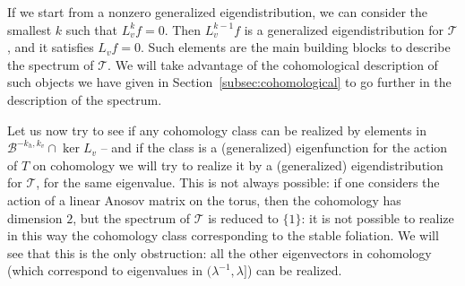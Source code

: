 \documentclass[10pt]{amsart}
\newcommand{\boB}{\mathcal{B}}
\newcommand{\boT}{\mathcal{T}}
\theoremstyle{definition}
\numberwithin{equation}{section}
\begin{document}
If we start from a nonzero generalized eigendistribution, we can consider the
smallest $k$ such that $L_v^k f = 0$. Then $L_v^{k-1} f$ is a generalized
eigendistribution for $\boT$, and it satisfies $L_v f = 0$. Such elements are
the main building blocks to describe the spectrum of $\boT$. We will take
advantage of the cohomological description of such objects we have given in
Section~\ref{subsec:cohomological} to go further in the description of the
spectrum.

Let us now try to see if any cohomology class can be realized by elements in
$\boB^{-k_h, k_v} \cap \ker L_v$ -- and if the class is a (generalized)
eigenfunction for the action of $T$ on cohomology we will try to realize it
by a (generalized) eigendistribution for $\boT$, for the same eigenvalue.
This is not always possible: if one considers the action of a linear Anosov
matrix on the torus, then the cohomology has dimension $2$, but the spectrum
of $\boT$ is reduced to $\{1\}$: it is not possible to realize in this way
the cohomology class corresponding to the stable foliation. We will see that
this is the only obstruction: all the other eigenvectors in cohomology (which
correspond to eigenvalues in $(\lambda^{-1}, \lambda]$) can be realized.
\end{document}
